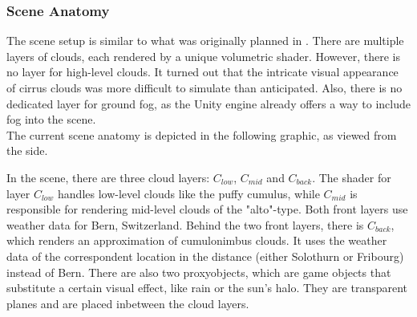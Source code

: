 \clearpage

\subsubsection{Scene Anatomy}
The scene setup is similar to what was originally planned in . There are multiple layers of clouds, each rendered by a unique \gls{volumetric} \gls{shader}.
However, there is no layer for high-level clouds. It turned out that the intricate visual appearance of cirrus clouds was more difficult to simulate than anticipated.
Also, there is no dedicated layer for ground fog, as the Unity engine already offers a way to include fog into the scene.
\\
The current scene anatomy is depicted in the following graphic, as viewed from the side.

\begin{figure}[H]
    \centering
    \label{img:tikz:techimpl:anatomy}
\end{figure}

\noindent
In the scene, there are three cloud layers: \color{red}$C_{low}$\color{black}, \color{red}$C_{mid}$ \color{black} and \color{red}$C_{back}$\color{black}.
The \gls{shader} for layer \color{red}$C_{low}$ \color{black} handles low-level clouds like the puffy cumulus, while \color{red}$C_{mid}$ \color{black} is responsible for rendering mid-level clouds of the "alto"-type.
Both front layers use weather data for Bern, Switzerland.
Behind the two front layers, there is \color{red}$C_{back}$\color{black}, which renders an approximation of cumulonimbus clouds. It uses the weather data of the correspondent location in the distance (either Solothurn or Fribourg) instead of Bern.
\emptyline
There are also two \gls{proxyobject}s, which are game objects that substitute a certain visual effect, like rain or the sun's halo.
They are transparent planes and are placed inbetween the cloud layers.

